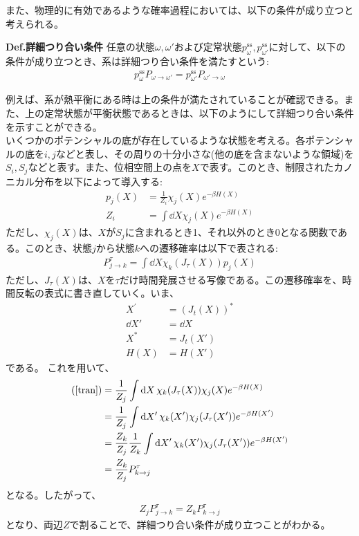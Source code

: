 \documentclass[a4paper,11pt]{jsarticle}
\numberwithin{equation}{section}
\begin{document}
また、物理的に有効であるような確率過程においては、以下の条件が成り立つと考えられる。
\begin{itembox}[l]{\textbf{Def.詳細つり合い条件}}
  任意の状態$\omega,\omega'$および定常状態$p^{\text{ss}}_{\omega},p^{\text{ss}}_{\omega'}$に対して、以下の条件が成り立つとき、系は詳細つり合い条件を満たすという:
  \begin{align}
    p_{\omega}^{\text{ss}}P_{\omega \to \omega'} = p_{\omega'}^{\text{ss}}P_{\omega' \to \omega}
  \end{align}
\end{itembox}
例えば、系が熱平衡にある時は上の条件が満たされていることが確認できる。また、上の定常状態が平衡状態であるときは、以下のようにして詳細つり合い条件を示すことができる。\\%

いくつかのポテンシャルの底が存在しているような状態を考える。各ポテンシャルの底を$i,j$などと表し、その周りの十分小さな(他の底を含まないような領域)を$S_i,S_j$などと表す。また、位相空間上の点を$X$で表す。このとき、制限されたカノニカル分布を以下によって導入する:
\begin{align}
  p_j(X) &= \frac{1}{Z_i}\chi_j(X) e^{-\beta H(X)}\\
  Z_i &= \int \dd{X}\chi_j(X) e^{-\beta H(X)}
\end{align}
ただし、$\chi_j(X)$は、$X$が$S_j$に含まれるとき1、それ以外のとき0となる関数である。このとき、状態$j$から状態$k$への遷移確率は以下で表される:
\begin{align}
  P_{j \to k}^{\tau} = \int \dd{X} \chi_k(J_{\tau}(X))p_j(X) \label{tran}
\end{align}
ただし、$J_{\tau}(X)$は、$X$を$\tau$だけ時間発展させる写像である。この遷移確率を、時間反転の表式に書き直していく。いま、
\begin{align}
  X^{'} &= (J_{t}(X))^{*}\\
  \dd{X}' &= \dd{X}\\
  X^{*} &= J_{t}(X')\\
  H(X) &= H(X')
\end{align}
である。%
これを用いて、
\begin{align}
  (\ref{tran}) &= \frac{1}{Z_j}\int \dd{X} \chi_k(J_{\tau}(X))\chi_j(X) e^{-\beta H(X)}\\
  &= \frac{1}{Z_j}\int \dd{X'} \chi_k(X')\chi_j(J_{\tau}(X')) e^{-\beta H(X')}\\
  &= \frac{Z_k}{Z_j}\frac{1}{Z_k}\int \dd{X'} \chi_k(X')\chi_j(J_{\tau}(X')) e^{-\beta H(X')}\\
  &= \frac{Z_k}{Z_j}P_{k \to j}^{\tau}
\end{align}
となる。したがって、
\begin{align}
  Z_jP_{j \to k}^{\tau} = Z_kP_{k \to j}^{\tau}
\end{align}
となり、両辺$Z$で割ることで、詳細つり合い条件が成り立つことがわかる。\\
\end{document}
